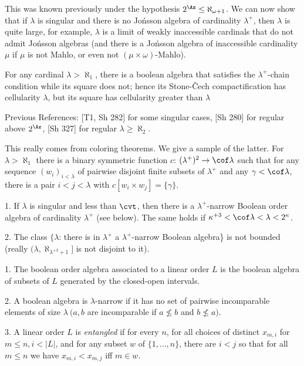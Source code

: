 This was known previously under the hypothesis 
$2^{\Az}\le\aleph_{\omega+1}$. We
 can
now show that if $\lambda$ is singular and there is no 
Jo\'nsson
algebra of cardinality $\lambda^+$, then $\lambda$ is 
quite large, for
example, $\lambda$ is a limit of weakly inaccessible 
cardinals that do
not admit Jo\'nsson algebras (and there is a Jo\'nsson 
algebra of
inaccessible cardinality $\mu$ if $\mu$ is not Mahlo, or 
even not
$(\mu\times\omega)$-Mahlo).
 
For any cardinal $\lambda>\aleph_1$, there is a boolean 
algebra that
satisfies
the $\lambda^+$-chain condition while its square does 
not\RM; hence its
Stone-\v Cech compactification has cellularity $\lambda$, 
but its
square has cellularity greater than $\lambda$
\endproclaim

Previous References: [T1, Sh 282] for some singular cases, 
[Sh 280] for regular
above $2^\Az$, [Sh 327] for regular $\lambda\ge \aleph_2$.
 
This really comes from coloring theorems. We give a sample 
of the
latter.
For $\lambda>\aleph_1$ there is a binary symmetric 
function $c$\RM:
$(\lambda^+)^2\to\cof \lambda$ such that for any sequence
$(w_i)_{i<\lambda}$ of pairwise disjoint finite subsets of 
$\lambda^+$
and any $\gamma<\cof \lambda$, there is a pair 
$i<j<\lambda$ with
$c[w_i\times w_j]=\{\gamma\}$.
\endproclaim
 
{\rm1.}
If $\lambda$ is singular and less than $\cvt$, then
there is a $\lambda^+$-narrow Boolean order algebra of 
cardinality
$\lambda^+$ \RM(see below\RM).
The same holds if $\kappa^{+
3}<\cof\lambda<\lambda<2^\kappa$.
 
{\rm2.} The class $\{\lambda$\RM: there is in $\lambda^+$ 
a $\lambda^+$-narrow
Boolean algebra\RM\} is not bounded
\RM(really $(\lambda, \aleph_{\lambda^{+3}+1}]$ is not 
disjoint to it\RM).
\endproclaim
 
1. The boolean order algebra associated to a linear order 
$L$
is the boolean algebra of subsets of $L$ generated by the 
closed-open
intervals.

2. A boolean algebra is $\lambda$-narrow if it has no set of
pairwise incomparable elements
of size $\lambda\ (a,b$ are incomparable if $a\not\le b$ and
$b\not\le a)$.

3. A linear order $L$ is {\it entangled\/} if for every 
$n$, for
all choices
of distinct $x_{m,i}$ for $m\le n, i<|L|$, and for any 
subset $w$ of
$\{1,\ldots,n\}$, there are $i<j$ so that for all $m\le n$ 
we have
$x_{m,i}<x_{m,j}$ iff $m\in w$.
 
